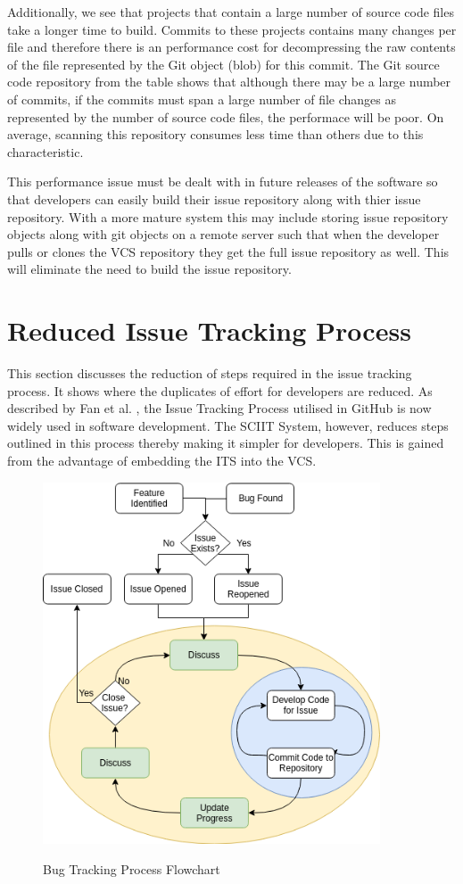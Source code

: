 \documentclass{mproj}
\begin{document}
Additionally, we see that projects that contain a large number of source code files take a longer time to build. Commits to these projects contains many changes per file and therefore there is an performance cost for decompressing the raw contents of the file represented by the Git object (blob) for this commit. The Git source code repository from the table shows that although there may be a large number of commits, if the commits must span a large number of file changes as represented by the number of source code files, the performace will be poor. On average, scanning this repository consumes less time than others due to this characteristic.

This performance issue must be dealt with in future releases of the software so that developers can easily build their issue repository along with thier issue repository. With a more mature system this may include storing issue repository objects along with git objects on a remote server such that when the developer pulls or clones the VCS repository they get the full issue repository as well. This will eliminate the need to build the issue repository.

\section{Reduced Issue Tracking Process}

This section discusses the reduction of steps required in the issue tracking process. It shows where the duplicates of effort for developers are reduced. As described by Fan et al. \cite{Fan:2017}, the Issue Tracking Process utilised in GitHub is now widely used in software development. The SCIIT System, however, reduces steps outlined in this process thereby making it simpler for developers. This is gained from the advantage of embedding the ITS into the VCS.

\begin{figure}
\centering
  \caption{Bug Tracking Process Flowchart}
  \includegraphics[width=10cm]{process-flowchart}
  \label{fig:process-flowchart}
\end{figure}
\end{document}
